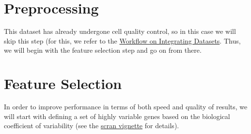 \documentclass[]{book}
\newenvironment{Shaded}{\begin{snugshade}}{\end{snugshade}}
\newcommand{\CommentTok}[1]{\textcolor[rgb]{0.56,0.35,0.01}{\textit{#1}}}
\newcommand{\DataTypeTok}[1]{\textcolor[rgb]{0.13,0.29,0.53}{#1}}
\newcommand{\FloatTok}[1]{\textcolor[rgb]{0.00,0.00,0.81}{#1}}
\newcommand{\KeywordTok}[1]{\textcolor[rgb]{0.13,0.29,0.53}{\textbf{#1}}}
\newcommand{\NormalTok}[1]{#1}
\newcommand{\OperatorTok}[1]{\textcolor[rgb]{0.81,0.36,0.00}{\textbf{#1}}}
\newcommand{\OtherTok}[1]{\textcolor[rgb]{0.56,0.35,0.01}{#1}}
\newcommand{\StringTok}[1]{\textcolor[rgb]{0.31,0.60,0.02}{#1}}
\begin{document}
\hypertarget{preprocessing-1}{%
\section{Preprocessing}\label{preprocessing-1}}

This dataset has already undergone cell quality control, so in this case we will skip this step (for this, we refer to the \protect\hyperlink{workflow-integrating-datasets}{Workflow on Integrating Datasets}. Thus, we will begin with the feature selection step and go on from there.

\hypertarget{feature-selection-1}{%
\section{Feature Selection}\label{feature-selection-1}}

In order to improve performance in terms of both speed and quality of results, we will start with defining a set of highly variable genes based on the biological coefficient of variability (see the \href{https://bioconductor.org/packages/devel/bioc/vignettes/scran/inst/doc/scran.html\#5_variance_modelling}{scran vignette} for details).

\begin{Shaded}
\end{Shaded}
\end{document}
